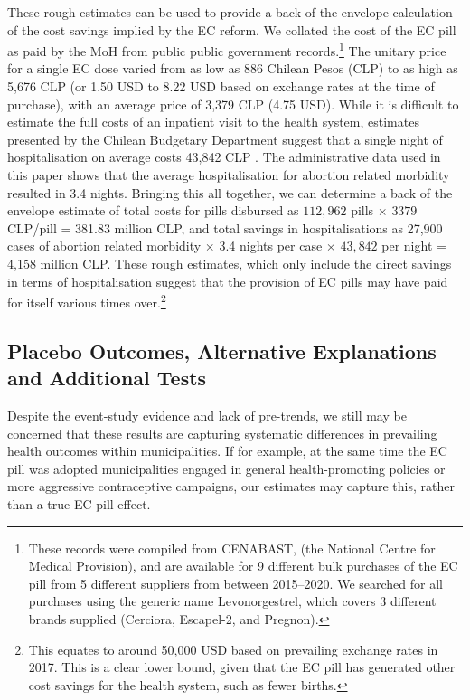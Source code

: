 \documentclass[12pt]{article}
\begin{document}
\begin{spacing}{1.9}
These rough estimates can be used to provide a back of the envelope calculation of the cost savings implied by the EC reform.  We collated the cost of the EC pill as paid by the MoH from public public government records.\footnote{These records were compiled from CENABAST, (the National Centre for Medical Provision), and are available for 9 different bulk purchases of the EC pill from 5 different suppliers from between 2015--2020.  We searched for all purchases using the generic name Levonorgestrel, which covers 3 different brands supplied (Cerciora, Escapel-2, and Pregnon).
}  The unitary price for a single EC dose varied from as low as 886 Chilean Pesos (CLP) to as high as 5,676 CLP (or 1.50 USD to 8.22 USD based on exchange rates at the time of purchase), with an average price of 3,379 CLP (4.75 USD).
While it is difficult to estimate the full costs of an inpatient visit to the health system, estimates presented by the Chilean Budgetary Department suggest that a single night of hospitalisation on average costs 43,842 CLP \citep{IAS2016}.  The administrative data used in this paper shows that the average hospitalisation for abortion related morbidity resulted in 3.4 nights.   Bringing this all together, we can determine a back of the envelope estimate of total costs for pills disbursed as $112,962$ pills $\times$ $3379$ CLP/pill = 381.83 million CLP, and total savings in hospitalisations as 27,900 cases of abortion related morbidity $\times$ 3.4 nights per case $\times$ $43,842$ per night = 4,158 million CLP.  These rough estimates, which only include the direct savings in terms of hospitalisation suggest that the provision of EC pills may have paid for itself various times over.\footnote{This equates to  around 50,000 USD based on prevailing exchange rates in 2017.  This is a clear lower bound, given that the EC pill has generated other cost savings for the health system, such as fewer births.}






  \subsection{Placebo Outcomes, Alternative Explanations and Additional Tests}
  \label{scn:robustness}
  Despite the event-study evidence and lack of pre-trends, we still may be concerned that these results are capturing systematic differences in prevailing health outcomes within municipalities. 
  If for example, at the same time the EC pill was adopted municipalities engaged in general health-promoting policies or more aggressive contraceptive campaigns, our estimates may capture this, rather than a true EC pill effect.


\end{spacing}
\end{document}
